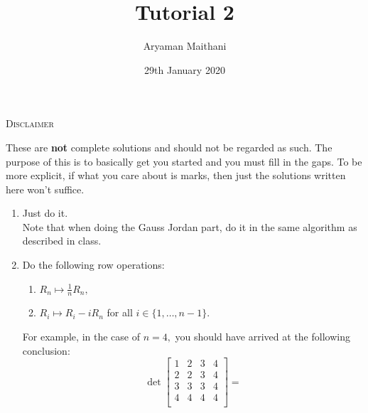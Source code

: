 \documentclass{article}
\title{Tutorial 2}				%
\author{Aryaman Maithani}%
\date{29th January 2020}		%
\begin{document}
\maketitle

\hrulefill

\begin{center}
	\textsc{Disclaimer}
\end{center}
These are \textbf{not} complete solutions and should not be regarded as such. The purpose of this is to basically get you started and you must fill in the gaps. To be more explicit, if what you care about is marks, then just the solutions written here won't suffice.

\hrulefill

\begin{enumerate} 
	\item Just do it. \\
	Note that when doing the Gauss Jordan part, do it in the same algorithm as described in class.
	\iffalse
	The following is one of the possible sequence of steps you could do for the Gauss Jordan part:
	\begin{enumerate*} 
		\item $R_2 \mapsto R_2/2$
		\item $R_3 \mapsto R_3 + R_1$
		\item $R_3 \mapsto R_3 - 2R_2$
		\item $R_1 \mapsto R_1 + R_2$
		\item $R_1 \mapsto R_1 + \frac{1}{2}R_3$
		\item $R_1 \mapsto \frac{1}{5}R_1$
		\item $R_1 \mapsto -\frac{1}{10}R_2$
	\end{enumerate*} \fi
	\item Do the following row operations:
	\begin{enumerate}[nosep] 
		\item $R_n \mapsto \frac{1}{n}R_n,$
		\item $R_i \mapsto R_i - iR_n$ for all $i \in \{1, \ldots, n - 1\}.$
	\end{enumerate}
	For example, in the case of $n = 4,$ you should have arrived at the following conclusion:
	\[\det \begin{bmatrix}
		1 & 2 & 3 & 4\\
		2 & 2 & 3 & 4\\
		3 & 3 & 3 & 4\\
		4 & 4 & 4 & 4\\
	\end{bmatrix}
	= 
\]
\end{enumerate}
\end{document}
